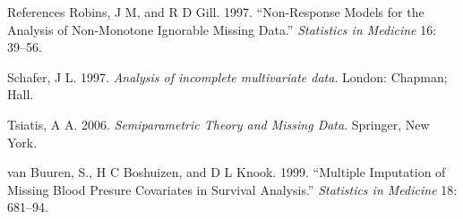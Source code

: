 \documentclass[ignorenonframetext,]{beamer}
\begin{document}
\begin{frame}[allowframebreaks]{References}
\leavevmode\hypertarget{ref-Robins1997}{}%
Robins, J M, and R D Gill. 1997. ``Non-Response Models for the Analysis
of Non-Monotone Ignorable Missing Data.'' \emph{Statistics in Medicine}
16: 39--56.

\leavevmode\hypertarget{ref-Schafer:1997}{}%
Schafer, J L. 1997. \emph{Analysis of incomplete multivariate data}.
London: Chapman; Hall.

\leavevmode\hypertarget{ref-Tsiatis:2006}{}%
Tsiatis, A A. 2006. \emph{Semiparametric Theory and Missing Data}.
Springer, New York.

\leavevmode\hypertarget{ref-VanBuurenux2fBoshuizenux2fKnook:1999}{}%
van Buuren, S., H C Boshuizen, and D L Knook. 1999. ``Multiple
Imputation of Missing Blood Presure Covariates in Survival Analysis.''
\emph{Statistics in Medicine} 18: 681--94.

\end{frame}
\end{document}
